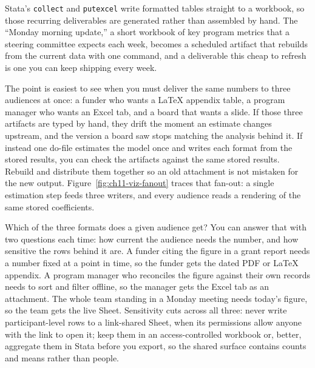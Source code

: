 Stata's \texttt{collect} and \texttt{putexcel} write formatted tables straight to a workbook, so those recurring deliverables are generated rather than assembled by hand. The \enquote{Monday morning update,} a short workbook of key program metrics that a steering committee expects each week, becomes a scheduled artifact that rebuilds from the current data with one command, and a deliverable this cheap to refresh is one you can keep shipping every week.

The point is easiest to see when you must deliver the same numbers to three audiences at once: a funder who wants a \LaTeX{} appendix table, a program manager who wants an Excel tab, and a board that wants a slide. If those three artifacts are typed by hand, they drift the moment an estimate changes upstream, and the version a board saw stops matching the analysis behind it. If instead one do-file estimates the model once and writes each format from the stored results, you can check the artifacts against the same stored results. Rebuild and distribute them together so an old attachment is not mistaken for the new output. Figure~\ref{fig:ch11-viz-fanout} traces that fan-out: a single estimation step feeds three writers, and every audience reads a rendering of the same stored coefficients.

Which of the three formats does a given audience get? You can answer that with two questions each time: how current the audience needs the number, and how sensitive the rows behind it are. A funder citing the figure in a grant report needs a number fixed at a point in time, so the funder gets the dated PDF or \LaTeX{} appendix. A program manager who reconciles the figure against their own records needs to sort and filter offline, so the manager gets the Excel tab as an attachment. The whole team standing in a Monday meeting needs today's figure, so the team gets the live Sheet. Sensitivity cuts across all three: never write participant-level rows to a link-shared Sheet, when its permissions allow anyone with the link to open it; keep them in an access-controlled workbook or, better, aggregate them in Stata before you export, so the shared surface contains counts and means rather than people.

